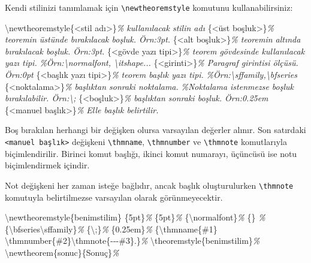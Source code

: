 \documentclass[
  10pt,
]{scrbook}
\newenvironment{Shaded}{\begin{snugshade}}{\end{snugshade}}
\newcommand{\CommentTok}[1]{\textcolor[rgb]{0.56,0.35,0.01}{\textit{#1}}}
\newcommand{\FunctionTok}[1]{\textcolor[rgb]{0.00,0.00,0.00}{#1}}
\newcommand{\NormalTok}[1]{#1}
\theoremstyle{definition}
\theoremstyle{definition}
\theoremstyle{definition}
\theoremstyle{definition}
\theoremstyle{remark}
\begin{document}
Kendi stilinizi tanımlamak için \texttt{\textbackslash{}newtheoremstyle} komutunu kullanabilirsiniz:

\begin{Shaded}
\begin{Highlighting}[]
\FunctionTok{\textbackslash{}newtheoremstyle}\NormalTok{\{\textless{}stil adı\textgreater{}\}}\CommentTok{\% kullanılacak stilin adı}
\NormalTok{\{\textless{}üst boşluk\textgreater{}\}}\CommentTok{\% teoremin üstünde bırakılacak boşluk. Örn:3pt.}
\NormalTok{\{\textless{}alt boşluk\textgreater{}\}}\CommentTok{\% teoremin altında bırakılacak boşluk. Örn:3pt.}
\NormalTok{\{\textless{}gövde yazı tipi\textgreater{}\}}\CommentTok{\% teorem gövdesinde kullanılacak yazı tipi.}
 \CommentTok{\%Örn:\textbackslash{}normalfont, \textbackslash{}itshape...}
\NormalTok{\{\textless{}girinti\textgreater{}\}}\CommentTok{\% Paragraf girintisi ölçüsü. Örn:0pt}
\NormalTok{\{\textless{}başlık yazı tipi\textgreater{}\}}\CommentTok{\% teorem başlık yazı tipi.}
 \CommentTok{\%Örn:\textbackslash{}sffamily,\textbackslash{}bfseries}
\NormalTok{\{\textless{}noktalama\textgreater{}\}}\CommentTok{\% başlıktan sonraki noktalama.}
 \CommentTok{\%Noktalama istenmezse boşluk bırakılabilir. Örn:\textbackslash{}; }
\NormalTok{\{\textless{}boşluk\textgreater{}\}}\CommentTok{\% başlıktan sonraki boşluk. Örn:0.25em}
\NormalTok{\{\textless{}manuel başlık\textgreater{}\}}\CommentTok{\% Elle başlık belirtilir.}
\end{Highlighting}
\end{Shaded}

Boş bırakılan herhangi bir değişken olursa varsayılan değerler alınır. Son satırdaki \texttt{\textless{}manuel\ başlık\textgreater{}} değişkeni \texttt{\textbackslash{}thmname}, \texttt{\textbackslash{}thmnumber} ve \texttt{\textbackslash{}thmnote} komutlarıyla biçimlendirilir. Birinci komut başlığı, ikinci komut numarayı, üçüncüsü ise notu biçimlendirmek içindir.

Not değişkeni her zaman isteğe bağlıdır, ancak başlık oluşturulurken \texttt{\textbackslash{}thmnote} komutuyla belirtilmezse varsayılan olarak görünmeyecektir.

\begin{Shaded}
\begin{Highlighting}[]
\FunctionTok{\textbackslash{}newtheoremstyle}\NormalTok{\{benimstilim\}}
\NormalTok{\{5pt\}}\CommentTok{\% }
\NormalTok{\{5pt\}}\CommentTok{\% }
\NormalTok{\{}\FunctionTok{\textbackslash{}normalfont}\NormalTok{\}}\CommentTok{\% }
\NormalTok{\{\} }\CommentTok{\%}
\NormalTok{\{}\FunctionTok{\textbackslash{}bfseries\textbackslash{}sffamily}\NormalTok{\}}\CommentTok{\%}
\NormalTok{\{}\FunctionTok{\textbackslash{};}\NormalTok{\}}\CommentTok{\% }
\NormalTok{\{0.25em\}}\CommentTok{\% }
\NormalTok{\{}\FunctionTok{\textbackslash{}thmname}\NormalTok{\{\#1\} }\FunctionTok{\textbackslash{}thmnumber}\NormalTok{\{\#2\}}\FunctionTok{\textbackslash{}thmnote}\NormalTok{\{{-}{-}{-}\#3\}.\}}\CommentTok{\%}
\FunctionTok{\textbackslash{}theoremstyle}\NormalTok{\{benimstilim\}}\CommentTok{\%}
\FunctionTok{\textbackslash{}newtheorem}\NormalTok{\{sonuc\}\{Sonuç\}}\CommentTok{\%}
\end{Highlighting}
\end{Shaded}
\end{document}
